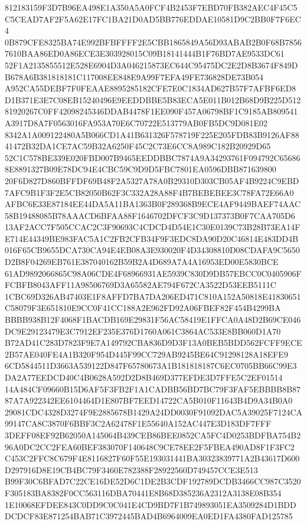 \documentclass[UTF8,fontset=fandol,zihao=-4,a4paper]{ctexart}
\begin{document}
{{812183159F3D7B96EA498E1A350A5A0FCF4B2453F7EBD70FB382AEC4F45C5C5CEAD7AF2F5A62E17FC1BA21D0AD5BB776EDDAE10581D9C2BB0F7F6EC4
0B879CFE8325BA74E992BFBFFFF2E5CBB1865849A56D93ABAB2B0F68B78567610BAA86ED0A86ECE3E303928015C09B18141444B1F76BD7AE9533DC61
52F1A2135855512E528E6904D3A046215873EC644C95475DC2E2D8B3674F849DB678A6B381818181C117008EE848E9A99F7EFA49FE736828DE73B054
A952CA55DEBF7F0FEAAE8895285182CFE7E0C1834AD627B57F7AFBF6ED8D1B371E3E7C08EB15240496E9EEDDBBE5B83ECA5E011B012B68D9B225D512
81920267C0FF42098245346DDAB4478F1EE090F457A06798BF1C9185AB809541A3917D8A7F0563016FA953A70E6C70722E513779AB0FB5DC9D081E02
8342A1A009122480A5B066CD1A41B631326F578719F225E205FDB83B9126AF8841472B32DA1CE7AC59B32A6250F45C2C73E6CC8A989C182B20929D65
52C1C578BE339E020FBD007B9465EEDDBBC7874A9A34293761F094792C656868E8891327B09E78DC94E4CBC59C9D9D5FBC7801EA0596DBB871639800
20F6D827D860BFFDF69B48F2A5327A78A0B29310D303CB05AF4B9224C9EBD7AFC9B1F3F2E5CB82050B62F3C332A28A88F4B7BEBEBEE3C78FA72E66A0
AFBC6E33E87184EE44DA5A11BA1363B0F289368B9ECE4AF9449BAEF74AAC58B19488085B78AAACD6BFAA88F1646702DFCF3C9D137373B0F7CAA705D6
13AF2ACC7F505CCAC2C3F90693C4CDCD4D54E1C30E0139C73B28B73EA14FE714E44349BE983FAC5A1C2FB2CFB34F9F3EDC8DA90D20C46814E483DD4B
016F65CB9655DCA730CA94E4EB08A3E930020F4D34308810D08CDAFA9C5650D2B8F04269EB761E387040162B59B2A4D689A7A4A16953ED00E5830BCE
61AD9892066865C98A06CDE4F68966931AE5939C830D9DB57EBCC0C0405906FFCBFB8043AFF11A98506769D3A65582AE794F672CA3522D53EEB5111C
1CBC69D326AB47403E1F8AFFD7BA7DA206ED471C810A152A50818E41830651C58079F3E651810E9CC0F41CC188A2E962FD92A06FBEF82F454B4299BA
BBBB938B12F4068F1BACDB169E29831F56AC58419E1FFCA0A48D2B69CE046DC9E29123479E3C7912EF235E376D1760A061C3864AC533E8BB060D1A70
B72AD41C283D7823F9E7A149792CBA836D9D3F13A0BEB5BDD562FCFF9ECE2B57AE040FE4A1B320F954D445F99CC729AB9245BE64C91298128A18EFE9
6CD5844511D3663A539122D847F65780673A1B181818187C6EC0705BB66C99E3DA2A77EEDCD40C4B0628A592D2D8B469D377EFDE3D7FFE5C2EF01514
14A484CF09660B15D6AF5F3FB2F1A1CADBB56BD7BC79F3FAF5EBBBB8B8787A7A922342EE6104464D1E807BF7EED14722CA5B010F11643B4D9A34B0A0
29081CDC4328D3274F9E2885678B1429A24DD0030F91092DAC5A39025F7124CA99147CA8C3870F6BBF3C2A62478F1E55640A152AC447E3D183DF7FFF
3DEFF08EF92B62050A145064B439CEB86BEE0852CA5FC4D0253BDFBA754B296A0DC2CC2FEA60BEF383070F140648C9CE78EE2F5FBEA490AD8F1F3FC2
C453C2FFC8C679F4E8116827F60F55E193031441BA30323839771A2B43617D600D297916D8E19CB4BC79F3460E782388F28922560D749457CCE3E513
B99F30C6BFAD7C22CE16DE52D6C1DE2B3CDF192789DCDB3466CC987C3520F305183BA8382F0CC563116DBA70441E8B68D385236A2312A3138E08B354
1E10068EFDEE843C0DD9C0C041E4CD9BD7F1B749893051EA3509284D1BDDDCDCF83E871254BAB71C3972445BAD4B6964009EA0ED1FA4380FAD125785
}}
\end{document}
